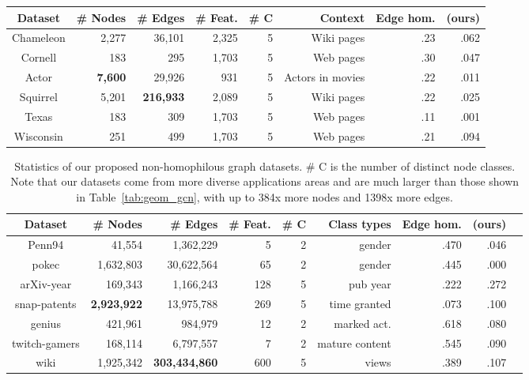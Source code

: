 \documentclass{article}
\begin{document}
\begin{table*}[t]
    \centering
    \caption{Statistics for previously used datasets from \citet{pei2019geom} (collected by \cite{rozemberczki2019multi, tang2009social, mitchell1997web}). \#C is the number of node classes. The highest number of nodes or edges overall are bolded.}
    {\footnotesize
    \begin{tabular}{crrrrrrr}
    \toprule
    Dataset & \# Nodes & \# Edges &  \# Feat. & \# C & Context & Edge hom. &  (ours) \\
    \midrule
         Chameleon & 2,277 & 36,101 & 2,325 & 5 & Wiki pages & .23 & .062\\
         Cornell & 183 & 295 & 1,703 & 5 & Web pages & .30 & .047\\
         Actor & \textbf{7,600} & 29,926 & 931 & 5 & Actors in movies  & .22 & .011\\
         Squirrel & 5,201 & \textbf{216,933} & 2,089 & 5 & Wiki pages & .22 & .025\\
         Texas  & 183 & 309 & 1,703 & 5 & Web pages & .11 & .001\\
         Wisconsin & 251 & 499 & 1,703 & 5 & Web pages & .21 & .094\\
    \bottomrule
    \end{tabular}
    }
    \vspace{-5pt}
    \label{tab:geom_gcn}
\end{table*}


\begin{table}[ht]
    \centering
    \caption{Statistics of our proposed non-homophilous graph datasets. \# C is the number of distinct node classes. Note that our datasets come from more diverse applications areas and are much larger than those shown in Table~\ref{tab:geom_gcn}, with up to 384x more nodes and 1398x more edges.}
    \label{tab:data_stats}
    {\footnotesize
    \begin{tabular}{crrrrrrrr}
    \toprule
    Dataset &  \# Nodes & \# Edges &  \# Feat. & \# C & Class types & Edge hom. &  (ours) \\
    \midrule
         Penn94 & 41,554 & 1,362,229  & 5 & 2 & gender & .470  & .046  \\
         pokec  & 1,632,803 & 30,622,564 & 65  &  2 & gender & .445 & .000 \\
         arXiv-year  & 169,343 & 1,166,243 & 128 & 5 & pub year & .222 & .272  \\
         snap-patents  & \textbf{2,923,922} & 13,975,788 & 269 & 5 & time granted & .073 & .100  \\
         genius  & 421,961 & 984,979 & 12 & 2 & marked act. & .618  & .080  \\
         twitch-gamers  & 168,114 & 6,797,557 & 7 & 2 & mature content & .545 & .090  \\
		 wiki  & 1,925,342 & \textbf{303,434,860} & 600 & 5 & views & .389 & .107 \\
    \bottomrule
    \end{tabular}
    }
    \vspace{0pt}
\end{table}
\end{document}
